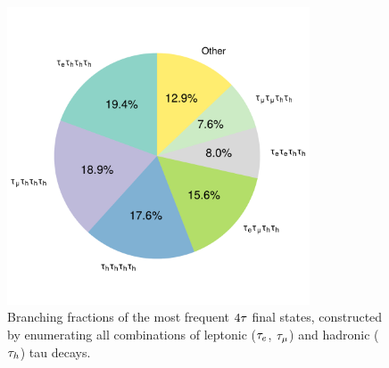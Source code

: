 \begin{figure}[h]
  \centering
  \includegraphics[width=0.8\textwidth]{Figures/Chapter6/pie_BF.pdf}
    \caption[Branching fractions of the dominant four-$\PGt$ decay modes.]
    {Branching fractions of the most frequent $4\tau$ final states, constructed by enumerating all combinations of leptonic ($\tau_e$, $\tau_{\mu}$) and hadronic ($\tau_h$) tau decays.}
  \label{Figure:Chapter6_4tau_decayModes_BF}
\end{figure}

